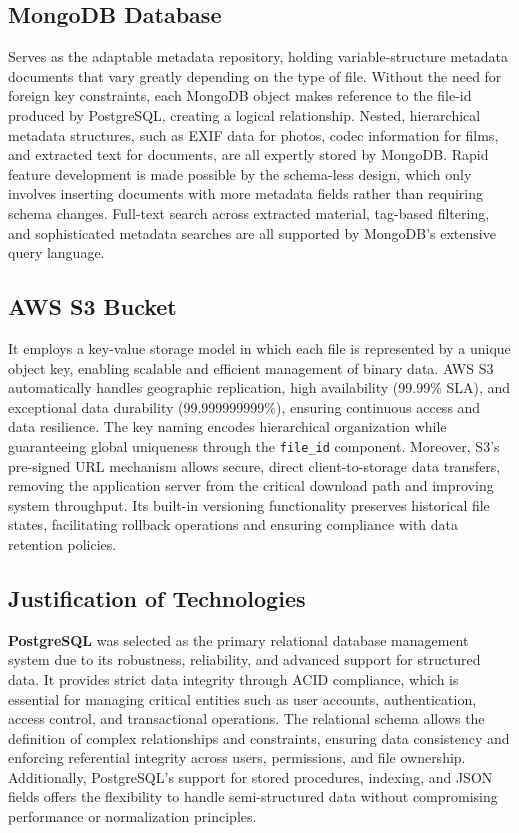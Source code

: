 \subsection{MongoDB Database}
Serves as the adaptable metadata repository, holding variable-structure metadata documents that vary greatly depending on the type of file. Without the need for foreign key constraints, each MongoDB object makes reference to the file-id produced by PostgreSQL, creating a logical relationship. Nested, hierarchical metadata structures, such as EXIF data for photos, codec information for films, and extracted text for documents, are all expertly stored by MongoDB. Rapid feature development is made possible by the schema-less design, which only involves inserting documents with more metadata fields rather than requiring schema changes. Full-text search across extracted material, tag-based filtering, and sophisticated metadata searches are all supported by MongoDB's extensive query language.
\subsection{AWS S3 Bucket}
It employs a key-value storage model in which each file is represented by a unique object key, enabling scalable and efficient management of binary data. AWS S3 automatically handles geographic replication, high availability (99.99\% SLA), and exceptional data durability (99.999999999\%), ensuring continuous access and data resilience. The key naming encodes hierarchical organization while guaranteeing global uniqueness through the \texttt{file\_id} component. Moreover, S3’s pre-signed URL mechanism allows secure, direct client-to-storage data transfers, removing the application server from the critical download path and improving system throughput. Its built-in versioning functionality preserves historical file states, facilitating rollback operations and ensuring compliance with data retention policies.
\subsection{Justification of Technologies}
\textbf{PostgreSQL} was selected as the primary relational database management system due to its robustness, reliability, and advanced support for structured data. It provides strict data integrity through ACID compliance, which is essential for managing critical entities such as user accounts, authentication, access control, and transactional operations. The relational schema allows the definition of complex relationships and constraints, ensuring data consistency and enforcing referential integrity across users, permissions, and file ownership. Additionally, PostgreSQL’s support for stored procedures, indexing, and JSON fields offers the flexibility to handle semi-structured data without compromising performance or normalization principles.

